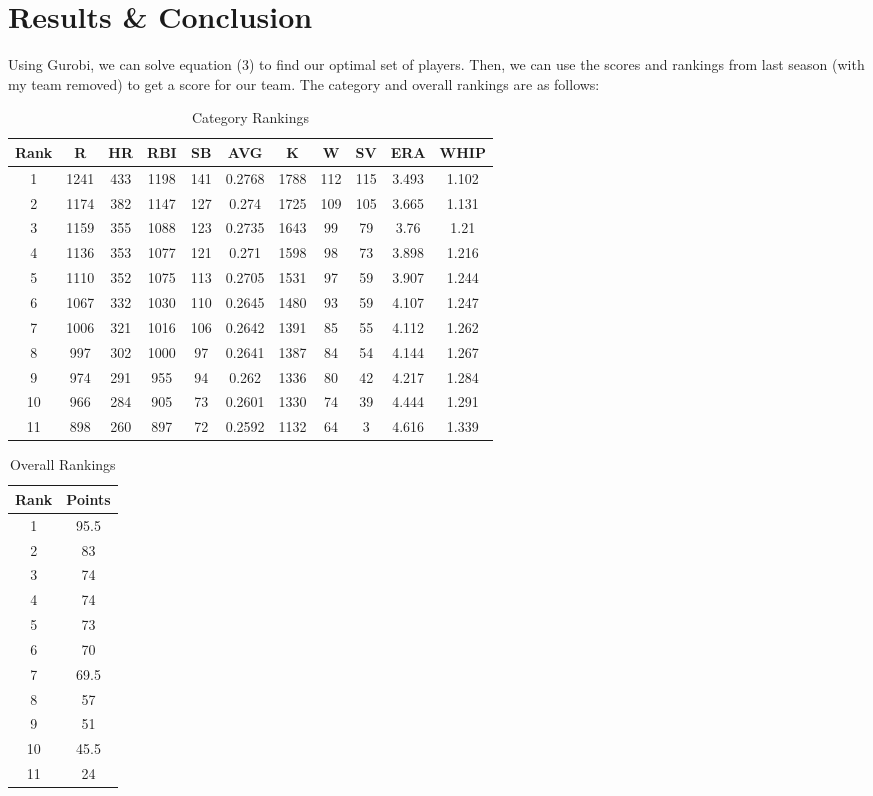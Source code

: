 \documentclass{article}
\begin{document}
\section*{Results \& Conclusion}
Using Gurobi, we can solve equation (3) to find our optimal set of players. Then, we can use the scores and rankings from last season (with my team removed) to get a score for our team. The category and overall rankings are as follows:

\begin{table}[ht] \caption{Category Rankings}
\centering
\begin{tabular}{c c c c c c c c c c c} 
\hline\hline 
Rank & R & HR & RBI & SB & AVG & K & W & SV & ERA & WHIP \\
\hline
1 & 1241 & 433 & 1198 & 141 & 0.2768 & 1788 & 112 & 115 & 3.493 & 1.102 \\
2 & 1174 & 382 & 1147 & 127 & 0.274 & 1725 & 109 & 105 & 3.665 & 1.131 \\
3 & 1159 & 355 & 1088 & 123 & 0.2735 & 1643 & 99 & 79 & 3.76 & 1.21 \\
4 & 1136 & 353 & 1077 & 121 & 0.271 & 1598 & 98 & 73 & 3.898 & 1.216 \\
5 & 1110 & 352 & 1075 & 113 & 0.2705 & 1531 & 97 & 59 & 3.907 & 1.244 \\
6 & 1067 & 332 & 1030 & 110 & 0.2645 & 1480 & 93 & 59 & 4.107 & 1.247 \\
7 & 1006 & 321 & 1016 & 106 & 0.2642 & 1391 & 85 & 55 & 4.112 & 1.262 \\
8 & 997 & 302 & 1000 & 97 & 0.2641 & 1387 & 84 & 54 & 4.144 & 1.267 \\
9 & 974 & 291 & 955 & 94 & 0.262 & 1336 & 80 & 42 & 4.217 & 1.284 \\
10 & 966 & 284 & 905 & 73 & 0.2601 & 1330 & 74 & 39 & 4.444 & 1.291 \\
11 & 898 & 260 & 897 & 72 & 0.2592 & 1132 & 64 & 3 & 4.616 & 1.339 \\ [1ex] 
\hline
\end{tabular}
\end{table}

\begin{table}[ht] \caption{Overall Rankings}
\centering
\begin{tabular}{c c}
\hline\hline
Rank & Points \\
\hline 
1 & 95.5 \\
2 & 83 \\
3 & 74 \\
4 & 74 \\
5 & 73 \\
6 & 70 \\
7 & 69.5 \\
8 & 57 \\
9 & 51 \\
10 & 45.5 \\
11 & 24 \\
\end{tabular}
\end{table}
\end{document}
